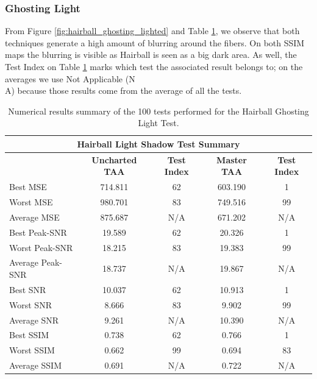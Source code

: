 \documentclass[pregrado]{tesis-usb} %
\begin{document}
\subsubsection{Ghosting Light}
From Figure \ref{fig:hairball_ghosting_lighted} and Table \ref{tab:hairball_ghosting_lighted}, we observe that both techniques generate a high amount of blurring around the fibers. On both SSIM maps the blurring is visible as Hairball is seen as a big dark area. As well, the Test Index on Table \ref{tab:hairball_ghosting_lighted} marks which test the associated result belongs to; on the averages we use Not Applicable (N\\A) because those results come from the average of all the tests. 
\begin{table}[H]
	\small
	\centering
	\caption{Numerical results summary of the 100 tests performed for the Hairball Ghosting Light Test.}
	\begin{tabular}{|l|c|c|c|c|}
		\hline
		\multicolumn{5}{|c|}{\textbf{Hairball Light Shadow Test Summary}} \\
		\hline
		\multicolumn{1}{|c|}{\textbf{\diagbox{Tests}{AA}}} & \textbf{Uncharted TAA} & \textbf{Test Index} & \textbf{Master TAA} & \textbf{Test Index} \\
		\hline
		Best MSE & 714.811 & 62    & 603.190 & 1 \\
		\hline
		Worst MSE & 980.701 & 83    & 749.516 & 99 \\
		\hline
		Average MSE & 875.687 & N/A   & 671.202 & N/A \\
		\hline
		Best Peak-SNR & 19.589 & 62    & 20.326 & 1 \\
		\hline
		Worst Peak-SNR & 18.215 & 83    & 19.383 & 99 \\
		\hline
		Average Peak-SNR  & 18.737 & N/A   & 19.867 & N/A \\
		\hline
		Best SNR & 10.037 & 62    & 10.913 & 1 \\
		\hline
		Worst SNR & 8.666 & 83    & 9.902 & 99 \\
		\hline
		Average SNR  & 9.261 & N/A   & 10.390 & N/A \\
		\hline
		Best SSIM & 0.738 & 62    & 0.766 & 1 \\
		\hline
		Worst SSIM & 0.662 & 99    & 0.694 & 83 \\
		\hline
		Average SSIM & 0.691 & N/A   & 0.722 & N/A \\
		\hline
	\end{tabular}%
	\label{tab:hairball_ghosting_lighted}%
\end{table}%
\end{document}
